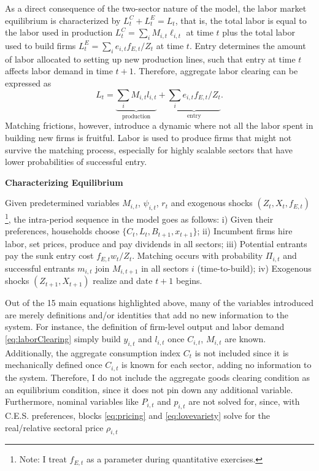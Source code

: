 \documentclass[a4paper,12pt]{article} %
\numberwithin{equation}{section} %
\numberwithin{figure}{section}
\numberwithin{table}{section}
\begin{document}
As a direct consequence of the two-sector nature of the model, the labor market equilibrium is characterized by $L^C_t+L^E_t = L_t$, that is, 
the total labor is equal to the labor used in production $L^C_t = \sum_iM_{i,t}\ell_{i,t}$ at time $t$ plus the total labor 
used to build firms $L^E_t = \sum_ie_{i,t} f_{E,t}/Z_t$ at time $t$. Entry determines the amount of labor allocated to setting 
up new production lines, such that entry at time $t$ affects labor demand in time $t+1$. Therefore, aggregate labor clearing can be expressed as
\begin{equation}
 L_t = \underbrace{\sum_i M_{i,t}l_{i,t}}_{\text{production}} + \underbrace{\sum_i e_{i,t}f_{E,t}/Z_t}_{\text{entry}}.\label{eq:AgglaborClearing}
\end{equation}
Matching frictions, however, introduce a dynamic where not all the labor spent in building new firms is fruitful. 
Labor is used to produce firms that might not survive the matching
process, especially for highly scalable sectors that have lower probabilities of successful entry.

\medskip
\medskip
\noindent\textbf{Characterizing Equilibrium}
\medskip

Given predetermined variables $M_{i,t}$, $\psi_{i,t}$, $r_t$ and exogenous shocks $(Z_{t},X_{t}, f_{E,t})$\footnote{Note: I treat 
$f_{E,t}$ as a parameter during quantitative exercises.}, the intra-period sequence in the model goes as follows: i) Given their preferences, households
choose $\{C_t,L_t,B_{t+1},x_{t+1}\}$; ii) Incumbent firms hire labor, set prices, produce and pay dividends in all sectors;
iii) Potential entrants pay the sunk entry cost $f_{E,t}w_t/Z_t$.  Matching occurs with probability $\Pi_{i,t}$ and 
successful entrants $m_{i,t}$ join $M_{i,t+1}$ in all sectors $i$ (time-to-build); iv) Exogenous shocks $(Z_{t+1},X_{t+1})$ realize and 
date $t{+}1$ begins.

Out of the 15 main equations highlighted above, many of the variables introduced are merely definitions and/or identities that add no new 
information to the system. 
For instance, the definition of firm-level output and labor demand \eqref{eq:laborClearing} simply build $y_{i,t}$ and $l_{i,t}$ 
once \( C_{i,t} \), \( M_{i,t} \) are known. Additionally, the aggregate consumption index $C_t$ is not included since it is mechanically 
defined once $C_{i,t}$ is known for each sector, adding no information to the system. Therefore, I do not include 
the aggregate goods clearing condition as an equilibrium condition, since it does not pin down any additional variable.
Furthermore, nominal variables like $P_{i,t}$ and $p_{i,t}$ are not solved for, since, with C.E.S. preferences, blocks 
\eqref{eq:pricing} and \eqref{eq:lovevariety} solve for the real/relative sectoral price $\rho_{i,t}$
\end{document}
